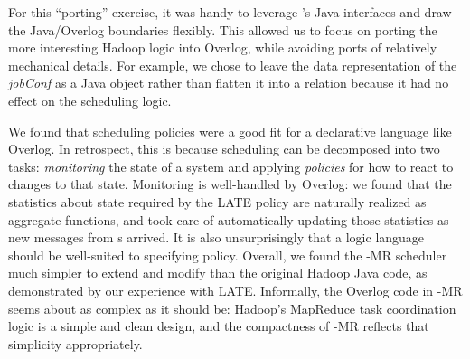 
For this ``porting'' exercise, it was handy to leverage \JOL's Java interfaces
and draw the Java/Overlog boundaries flexibly.  This allowed us to focus on
porting the more interesting Hadoop logic into Overlog, while avoiding ports of
relatively mechanical details.  For example, we chose to leave the data
representation of the \emph{jobConf} as a Java object rather than flatten it
into a relation because it had no effect on the scheduling logic.

We found that scheduling policies were a good fit for a declarative language
like Overlog. In retrospect, this is because scheduling can be decomposed into
two tasks: \emph{monitoring} the state of a system and applying \emph{policies}
for how to react to changes to that state. Monitoring is well-handled by
Overlog: we found that the statistics about {\TT} state required by the LATE
policy are naturally realized as aggregate functions, and \JOL took care of
automatically updating those statistics as new messages from {\TT}s arrived. It
is also unsurprisingly that a logic language should be well-suited to specifying
policy. Overall, we found the \BOOM-MR scheduler much simpler to extend and
modify than the original Hadoop Java code, as demonstrated by our experience
with LATE\@.  Informally, the Overlog code in \BOOM-MR seems about as complex as
it should be: Hadoop's MapReduce task coordination logic is a simple and clean
design, and the compactness of \BOOM-MR reflects that simplicity appropriately.
